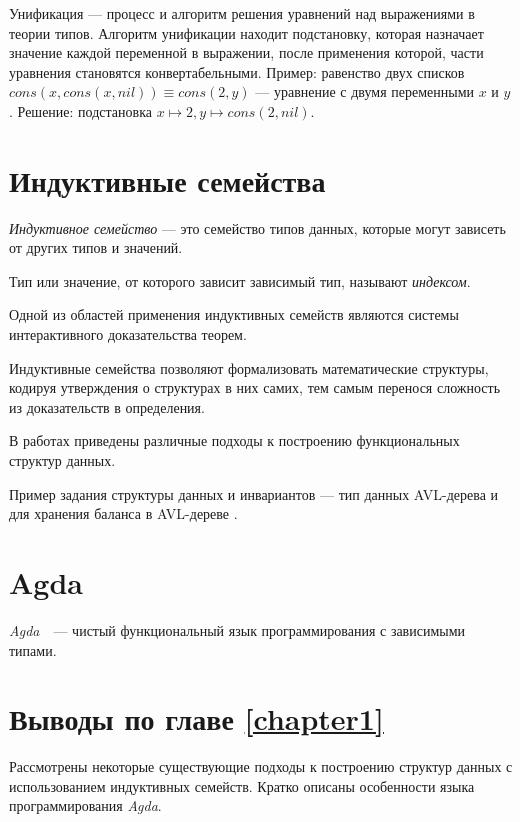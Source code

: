 Унификация — процесс и алгоритм решения уравнений над выражениями в теории типов.
Алгоритм унификации находит подстановку, которая назначает значение
каждой переменной в выражении, после применения которой,
части уравнения становятся конвертабельными.
Пример: равенство двух списков $cons(x,cons(x,nil)) \equiv cons(2,y) $
— уравнение с двумя переменными $x$ и $y$.
Решение: подстановка $ x \mapsto 2, y \mapsto cons(2,nil) $.

\section{Индуктивные семейства}

\begin{definition}
\emph{Индуктивное семейство} \cite{DybjerIndFam}— это семейство типов данных,
которые могут зависеть от других типов и значений.

Тип или значение, от которого зависит зависимый тип, называют \emph{индексом}.
\end{definition}

Одной из областей применения индуктивных семейств являются системы интерактивного
доказательства теорем.

Индуктивные семейства позволяют формализовать математические структуры,
кодируя утверждения о структурах в них самих, тем самым перенося сложность из
доказательств в определения.

В работах \cite{OkasakiThesis, McBridePivotal} приведены различные подходы
к построению функциональных структур данных.

Пример задания структуры данных и инвариантов —
тип данных AVL-дерева и для хранения баланса в AVL-дереве \cite{AVLTree}.
\newline


\section{Agda}
\textit{Agda}~\cite{AgdaLang}~---  чистый функциональный язык программирования с зависимыми типами.


\section{Выводы по главе \ref{chapter1}}
Рассмотрены некоторые существующие подходы к построению структур данных
с использованием индуктивных семейств.
Кратко описаны особенности языка программирования \textit{Agda}.
